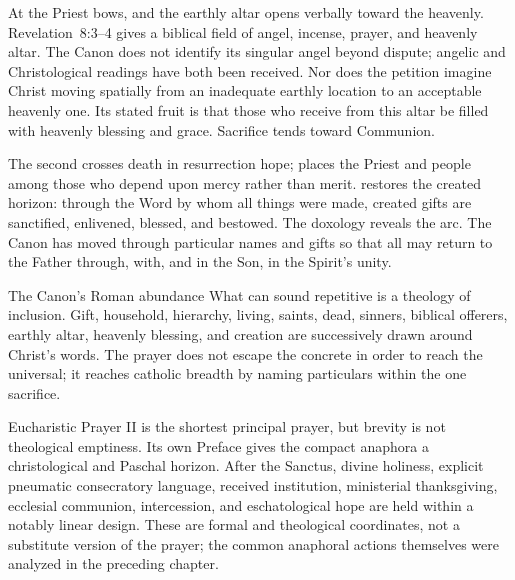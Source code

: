 At  the Priest bows, and the earthly altar opens verbally toward the heavenly. Revelation~8:3--4 gives a biblical field of angel, incense, prayer, and heavenly altar. The Canon does not identify its singular angel beyond dispute; angelic and Christological readings have both been received. Nor does the petition imagine Christ moving spatially from an inadequate earthly location to an acceptable heavenly one. Its stated fruit is that those who receive from this altar be filled with heavenly blessing and grace. Sacrifice tends toward Communion.

The second  crosses death in resurrection hope;  places the Priest and people among those who depend upon mercy rather than merit.  restores the created horizon: through the Word by whom all things were made, created gifts are sanctified, enlivened, blessed, and bestowed. The doxology reveals the arc. The Canon has moved through particular names and gifts so that all may return to the Father through, with, and in the Son, in the Spirit's unity.

\begin{massbox}{The Canon's Roman abundance}
What can sound repetitive is a theology of inclusion. Gift, household, hierarchy, living, saints, dead, sinners, biblical offerers, earthly altar, heavenly blessing, and creation are successively drawn around Christ's words. The prayer does not escape the concrete in order to reach the universal; it reaches catholic breadth by naming particulars within the one sacrifice.
\end{massbox}


Eucharistic Prayer II is the shortest principal prayer, but brevity is not theological emptiness. Its own Preface gives the compact anaphora a christological and Paschal horizon. After the Sanctus, divine holiness, explicit pneumatic consecratory language, received institution, ministerial thanksgiving, ecclesial communion, intercession, and eschatological hope are held within a notably linear design. These are formal and theological coordinates, not a substitute version of the prayer; the common anaphoral actions themselves were analyzed in the preceding chapter.

